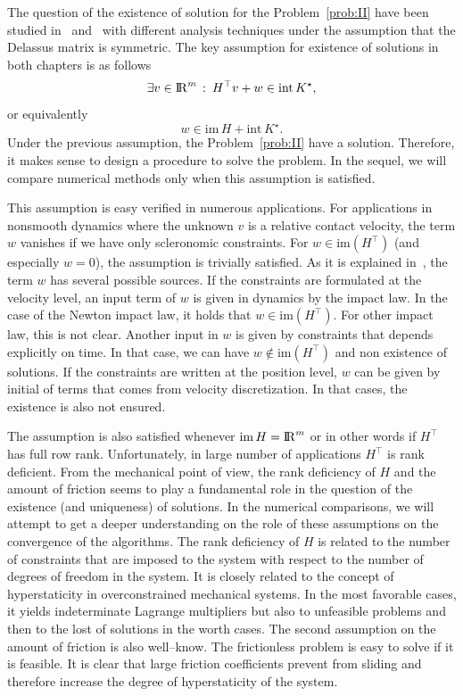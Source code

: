 {The question of the existence of solution for the Problem~\ref{prob:II} have been studied in~\cite{Klarbring.Pang1998} and~\cite{Acary.ea_ZAMM2011} with different analysis techniques under the assumption that the Delassus matrix is symmetric.
The key assumption for existence of solutions in both chapters is as follows
\begin{equation}\label{ass}
   \exists v\in \RR^m \,:\: H^\top v + w \in \mathrm{int}\, K^\star,
\end{equation}
or equivalently
\begin{equation}\label{asseq}
  w\in\mathrm{im}\, H + \mathrm{int}\, K^\star.
\end{equation}
Under the previous assumption, the Problem~\ref{prob:II} have a solution.
Therefore, it makes sense to design a procedure to solve the problem. In the sequel, we will compare numerical methods only when this assumption is satisfied.

This assumption is easy verified in numerous applications. For applications in nonsmooth dynamics where the unknown $v$ is a relative contact velocity, the term $w$ vanishes if we have only scleronomic constraints. For $w \in \mathrm{im}(H^\top)$ (and especially $w=0$), the assumption is trivially satisfied. As it is explained in~\cite{Acary.Cadoux2013}, the term $w$ has several possible sources. If the constraints are formulated at the velocity level, an input term of $w$ is given in dynamics by the impact law. In the case of the Newton impact law, it holds that $w \in \mathrm{im}(H^\top)$.   For other impact law, this is not clear. Another input in $w$ is given by constraints that depends explicitly on time. In that case, we can have $w \not\in \mathrm{im}(H^\top)$ and non existence of solutions. If the constraints are written at the position level, $w$ can be given by initial of terms that comes from velocity discretization. In that cases, the existence is also not ensured.

The assumption is also satisfied {whenever} $\mathrm{im}\, H = \mathrm{I\!R}^m$ or in other words if $H^\top$ has full row rank. Unfortunately, in large number of applications $H^\top$ is rank deficient. 
From the mechanical point of view, the rank deficiency of $H$ and the amount of friction seems to play a fundamental role in the question of the existence (and uniqueness) of solutions. In the numerical comparisons, we will attempt to get a deeper understanding on the role of these assumptions on the convergence of the algorithms. The rank deficiency  of $H$ is related to the number of constraints that are imposed to the system with respect to the number of degrees of freedom in the system. It is closely related to the concept of hyperstaticity in overconstrained mechanical  systems. In the most favorable cases, it yields  indeterminate Lagrange multipliers but also to unfeasible problems and then to the lost of solutions in the worth cases. The second assumption on the amount of friction is also well--know. The frictionless problem is  easy to solve if it is  feasible. It is clear that large friction coefficients prevent from sliding and therefore increase the degree of hyperstaticity of the system. 



}

